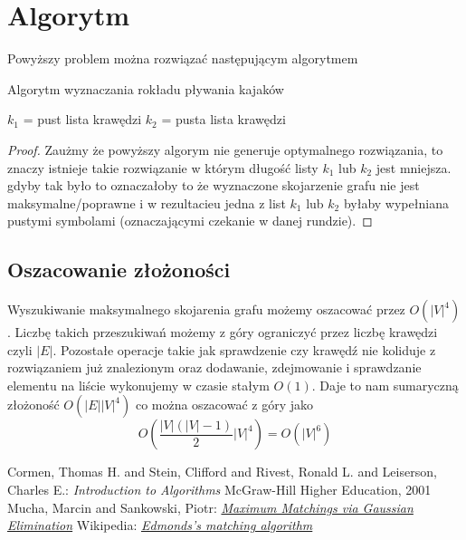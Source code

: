 \documentclass{llncs}
\begin{document}
\section{Algorytm}
Powyższy problem można rozwiązać następującym algorytmem

\begin{algorithm}[H]
 \caption{Algorytm wyznaczania rokładu pływania kajaków}
 $k_1$ = pust lista krawędzi\;
 $k_2$ = pusta lista krawędzi\;
\end{algorithm}

\begin{proof}
Zaużmy że powyższy algorym nie generuje optymalnego rozwiązania, to znaczy istnieje
takie rozwiązanie w którym długość listy $k_1$ lub $k_2$ jest mniejsza.
gdyby tak było to oznaczałoby to że wyznaczone skojarzenie grafu nie jest maksymalne/poprawne
i w rezultacieu jedna z list $k_1$ lub $k_2$ byłaby wypełniana pustymi
symbolami (oznaczającymi czekanie w danej rundzie).
\end{proof}

\subsection{Oszacowanie złożoności}

Wyszukiwanie maksymalnego skojarenia grafu możemy oszacować przez $O(|V|^4)$\cite{wiki-blossom}.
Liczbę takich przeszukiwań możemy z góry ograniczyć przez liczbę krawędzi czyli $|E|$. 
Pozostałe operacje takie jak sprawdzenie czy krawędź nie koliduje z rozwiązaniem już znalezionym
oraz dodawanie, zdejmowanie i sprawdzanie elementu na liście wykonujemy w czasie stałym $O(1)$.
Daje to nam sumaryczną złożoność $O(|E||V|^4)$ co można oszacować z góry jako 
\begin{equation}
O(\frac{|V|(|V|-1)}{2} |V|^4) = O(|V|^6)
\end{equation}

%
%
\begin{thebibliography}{4}
%
Cormen, Thomas H. and Stein, Clifford and Rivest, Ronald L. and Leiserson, Charles E.:
\textsl{Introduction to Algorithms}
McGraw-Hill Higher Education, 2001
Mucha, Marcin and Sankowski, Piotr:
\textsl{\href{http://www.mimuw.edu.pl/~mucha/pub/mucha_sankowski_focs04.pdf}{Maximum Matchings via Gaussian Elimination}}
Wikipedia:
\textsl{\href{http://en.wikipedia.org/wiki/Blossom_algorithm}{Edmonds's matching algorithm}}
\end{thebibliography}
\end{document}
